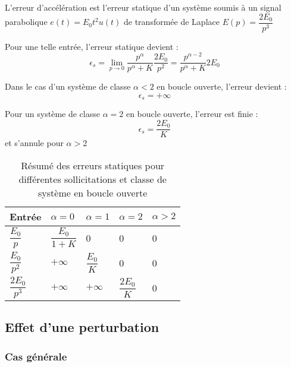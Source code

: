 L'erreur d'accélération est l'erreur statique d'un système soumis à un signal
parabolique $e(t)=E_0t^2 u(t)$ de transformée de Laplace 
$E(p)=\dfrac{2E_0}{p^3}$

Pour une telle entrée, l'erreur statique devient :
$$
\epsilon_s=\lim\limits_{p\to 0} \dfrac{p^\alpha}{p^\alpha+K}\dfrac{2E_0}{p^2}
          =\dfrac{p^{\alpha-2}}{p^\alpha+K}2E_0 
$$

Dans le cas d'un système de classe $\alpha<2$ en boucle ouverte, 
l'erreur devient :
$$
\epsilon_s=+\infty
$$

Pour un système de classe $\alpha=2$ en boucle ouverte, 
l'erreur est finie :
$$
\epsilon_s=\dfrac{2E_0}{K}
$$
et s'annule pour $\alpha>2$

\begin{table}
    \centering
    \begin{tabular}{@{}P{2cm}P{2cm}P{2cm}P{2cm}P{2cm}@{}}
    \toprule
    Entrée & $\alpha=0$ & $\alpha=1$ & $\alpha=2$ & $\alpha>2$ \\
    \midrule
    $\dfrac{E_0}{p}$&$\dfrac{E_0}{1+K}$&0&0&0\\
    $\dfrac{E_0}{p^2}$&$+\infty$&$\dfrac{E_0}{K}$&0&0\\
    $\dfrac{2E_0}{p^3}$&$+\infty$&$+\infty$&$\dfrac{2E_0}{K}$&0\\
    \bottomrule
    \end{tabular}
\caption{Résumé des erreurs statiques pour différentes 
         sollicitations et classe de système en boucle ouverte}
\end{table}

\subsection{Effet d'une perturbation}

\subsubsection{Cas générale}


